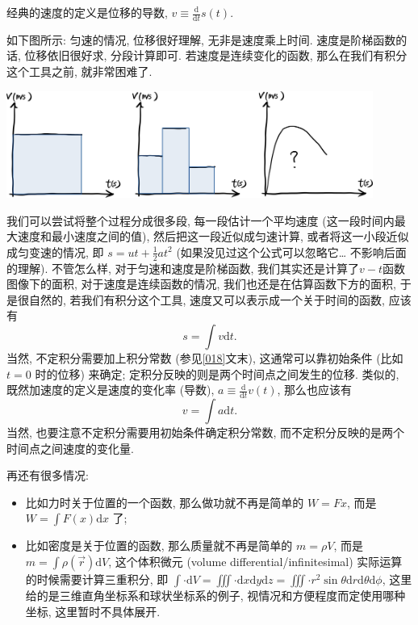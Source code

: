 \begin{tcolorbox}[size=fbox, breakable, enhanced jigsaw, title={应用? - 和物理的联系}]

经典的速度的定义是位移的导数,
\(v\equiv \frac{\mathrm{d}}{\mathrm{d}t}s(t)\).

如下图所示: 匀速的情况, 位移很好理解, 无非是速度乘上时间.
速度是阶梯函数的话, 位移依旧很好求, 分段计算即可.
若速度是连续变化的函数, 那么在我们有积分这个工具之前, 就非常困难了.

\begin{tcolorbox}[size=fbox, breakable, enhanced jigsaw]
\includegraphics[width=0.9\textwidth]{img/image-20230912164801681.png}
\end{tcolorbox}

我们可以尝试将整个过程分成很多段, 每一段估计一个平均速度
(这一段时间内最大速度和最小速度之间的值), 然后把这一段近似成匀速计算,
或者将这一小段近似成匀变速的情况, 即 \(s=ut+\frac{1}{2}at^2\)
(如果没见过这个公式可以忽略它\ldots{} 不影响后面的理解). 不管怎么样,
对于匀速和速度是阶梯函数, 我们其实还是计算了\(v-t\)函数图像下的面积,
对于速度是连续函数的情况, 我们也还是在估算函数下方的面积, 于是很自然的,
若我们有积分这个工具, 速度又可以表示成一个关于时间的函数, 应该有 \[
s=\int v\mathrm{d}t.
\] 当然, 不定积分需要加上积分常数 (参见\ref{018}文末),
这通常可以靠初始条件 (比如 \(t=0\) 时的位移) 来确定;
定积分反映的则是两个时间点之间发生的位移. 类似的,
既然加速度的定义是速度的变化率 (导数),
\(a\equiv \frac{\mathrm{d}}{\mathrm{d}t}v(t)\), 那么也应该有 \[
v=\int a\mathrm{d}t.
\] 当然, 也要注意不定积分需要用初始条件确定积分常数,
而不定积分反映的是两个时间点之间速度的变化量.

再还有很多情况:

\begin{itemize}
\item
  比如力时关于位置的一个函数, 那么做功就不再是简单的 \(W=Fx\), 而是
  \(W=\int F(x)\mathrm{d}x\) 了;
\item
  比如密度是关于位置的函数, 那么质量就不再是简单的 \(m=\rho V\), 而是
  \(m=\int \rho(\vec{r})\mathrm{d}V\), 这个体积微元 (volume
  differential/infinitesimal) 实际运算的时候需要计算三重积分, 即
  \(\int\cdot\mathrm{d}V=\iiint\cdot\mathrm{d}x\mathrm{d}y\mathrm{d}z=\iiint\cdot r^2\sin\theta\mathrm{d}r\mathrm{d}\theta\mathrm{d}\phi\),
  这里给的是三维直角坐标系和球状坐标系的例子,
  视情况和方便程度而定使用哪种坐标, 这里暂时不具体展开.
\end{itemize}
\end{tcolorbox}